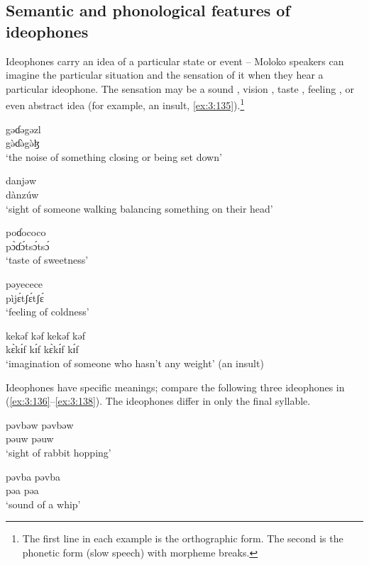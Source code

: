 \subsection{Semantic and phonological features of ideophones}\label{sec:3.6.1}
\hypertarget{RefHeading1211261525720847}{}
Ideophones carry an idea of a particular state or event -- Moloko speakers can imagine the particular situation and the sensation of it when they hear a particular ideophone. The sensation may be a sound , vision , taste , feeling , or even abstract idea (for example, an insult, \ref{ex:3:135}).\footnote{The first line in each example is the orthographic form. The second is the phonetic form (slow speech) with morpheme breaks.} 

\ea \label{ex:3:131}
\gll gəɗəgəzl\\
  g\`{ə}ɗ\`{ə}g\`{ə}ɮ\\
\glt  ‘the noise of something closing or being set down’
\z

\ea \label{ex:3:132}
\gll danjəw\\
  dànzúw\\
\glt  ‘sight of someone walking balancing something on their head’
\z

\ea \label{ex:3:133}
\gll poɗococo\\
  p\`{ɔ}ɗ\'{ɔ}ts\'{ɔ}ts\'{ɔ}\\
\glt  ‘taste of sweetness’
\z

\ea \label{ex:3:134}
\gll pəyecece\\
  pìj\'{ɛ}tʃ\'{ɛ}tʃ\'{ɛ}\\
\glt  ‘feeling of coldness’
\z

\ea \label{ex:3:135}
\gll kekəf  kəf  kekəf  kəf\\
  k\`{ɛ}k\'{ɪ}f    k\'{ɪ}f      k\`{ɛ}k\'{ɪ}f  k\'{ɪ}f\\
\glt  ‘imagination of someone who hasn’t any weight’ (an insult)
\z

Ideophones have specific meanings; compare the following three ideophones in (\ref{ex:3:136}--\ref{ex:3:138}). The ideophones differ in only the final syllable.

\ea \label{ex:3:136}
\gll pəvbəw pəvbəw\\
  pə\dentalflap uw pə\dentalflap uw\\
\glt  ‘sight of rabbit hopping’
\z

\ea \label{ex:3:137}
\gll pəvba  pəvba\\
  pə\dentalflap a  pə\dentalflap a\\
\glt  ‘sound of a whip’
\z

